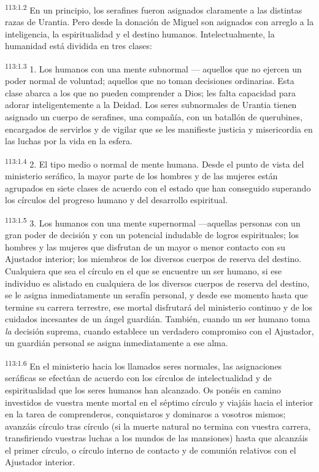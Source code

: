 \documentclass[twoside, 11pt]{book}
\begin{document}
\par
\textsuperscript{113:1.2} En un principio, los serafines fueron asignados claramente a las distintas razas de Urantia. Pero desde la donación de Miguel son asignados con arreglo a la inteligencia, la espiritualidad y el destino humanos. Intelectualmente, la humanidad está dividida en tres clases:

\par
\textsuperscript{113:1.3} 1. Los humanos con una mente subnormal --- aquellos que no ejercen un poder normal de voluntad; aquellos que no toman decisiones ordinarias. Esta clase abarca a los que no pueden comprender a Dios; les falta capacidad para adorar inteligentemente a la Deidad. Los seres subnormales de Urantia tienen asignado un cuerpo de serafines, una compañía, con un batallón de querubines, encargados de servirlos y de vigilar que se les manifieste justicia y misericordia en las luchas por la vida en la esfera.

\par
\textsuperscript{113:1.4} 2. El tipo medio o normal de mente humana. Desde el punto de vista del ministerio seráfico, la mayor parte de los hombres y de las mujeres están agrupados en siete clases de acuerdo con el estado que han conseguido superando los círculos del progreso humano y del desarrollo espiritual.

\par
\textsuperscript{113:1.5} 3. Los humanos con una mente supernormal ---aquellas personas con un gran poder de decisión y con un potencial indudable de logros espirituales; los hombres y las mujeres que disfrutan de un mayor o menor contacto con su Ajustador interior; los miembros de los diversos cuerpos de reserva del destino. Cualquiera que sea el círculo en el que se encuentre un ser humano, si ese individuo es alistado en cualquiera de los diversos cuerpos de reserva del destino, se le asigna inmediatamente un serafín personal, y desde ese momento hasta que termine su carrera terrestre, ese mortal disfrutará del ministerio continuo y de los cuidados incesantes de un ángel guardián. También, cuando un ser humano toma \textit{la} decisión suprema, cuando establece un verdadero compromiso con el Ajustador, un guardián personal se asigna inmediatamente a ese alma.

\par
\textsuperscript{113:1.6} En el ministerio hacia los llamados seres normales, las asignaciones seráficas se efectúan de acuerdo con los círculos de intelectualidad y de espiritualidad que los seres humanos han alcanzado. Os ponéis en camino investidos de vuestra mente mortal en el séptimo círculo y viajáis hacia el interior en la tarea de comprenderos, conquistaros y dominaros a vosotros mismos; avanzáis círculo tras círculo (si la muerte natural no termina con vuestra carrera, transfiriendo vuestras luchas a los mundos de las mansiones) hasta que alcanzáis el primer círculo, o círculo interno de contacto y de comunión relativos con el Ajustador interior.
\end{document}
